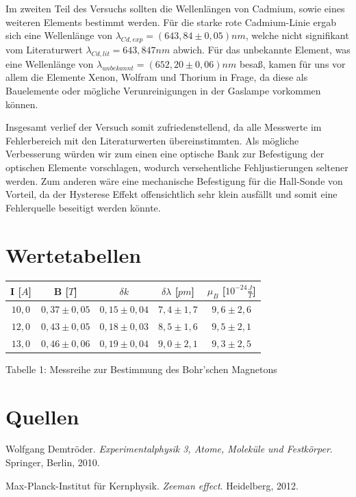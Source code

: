 Im zweiten Teil des Versuchs sollten die Wellenlängen von Cadmium, sowie eines weiteren Elements bestimmt werden. Für die starke rote Cadmium-Linie ergab sich eine Wellenlänge von $\lambda_{Cd, exp} = (643,84 \pm 0,05) nm$, welche nicht signifikant vom Literaturwert $\lambda_{Cd, lit} = 643,847nm$ abwich.
Für das unbekannte Element, was eine Wellenlänge von $\lambda_{unbekannt} = (652,20 \pm 0,06) nm$ besaß, kamen für uns vor allem die Elemente Xenon, Wolfram und Thorium in Frage, da diese als Bauelemente oder mögliche Verunreinigungen in der Gaslampe vorkommen können.

Insgesamt verlief der Versuch somit zufriedenstellend, da alle Messwerte im Fehlerbereich mit den Literaturwerten übereinstimmten. Als mögliche Verbesserung würden wir zum einen eine optische Bank zur Befestigung der optischen Elemente vorschlagen, wodurch versehentliche Fehljustierungen seltener werden. Zum anderen wäre eine mechanische Befestigung für die Hall-Sonde von Vorteil, da der Hysterese Effekt offensichtlich sehr klein ausfällt und somit eine Fehlerquelle beseitigt werden könnte.

\appendices
\section{Wertetabellen}
\begin{minipage}{\linewidth}
\centering
\begin{tabular}{c | c | c | c | c }
  I [$A$] & B [$T$] & ${\delta k}$ & $\delta \lambda$ [$pm$] & $\mu_B$ [$10^{-24} \frac{J}{T}$] \\
  \hline
  $10,0$ & $0,37 \pm 0,05$ & $0,15 \pm 0,04$ & $7,4 \pm 1,7$ & $9,6 \pm 2,6$ \\
  $12,0$ & $0,43 \pm 0,05$ & $0,18 \pm 0,03$ & $8,5 \pm 1,6$ & $9,5 \pm 2,1$ \\
  $13,0$ & $0,46 \pm 0,06$ & $0,19 \pm 0,04$ & $9,0 \pm 2,1$ & $9,3 \pm 2,5$ \\
\end{tabular}
\bigskip
Tabelle 1: Messreihe zur Bestimmung des Bohr'schen Magnetons
\end{minipage}

\section{Quellen}
Wolfgang Demtröder. \emph{Experimentalphysik 3, Atome, Moleküle und Festkörper}. Springer, Berlin, 2010.

Max-Planck-Institut für Kernphysik. \emph{Zeeman effect}. Heidelberg, 2012.

